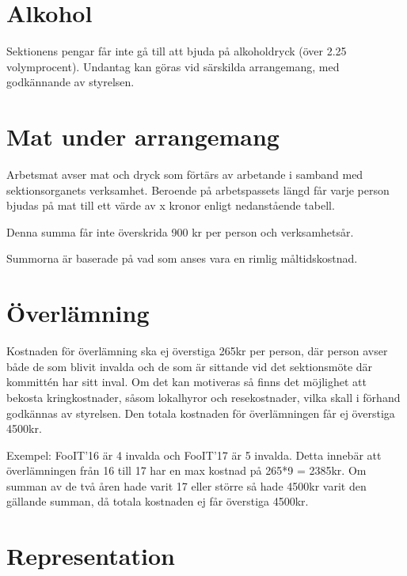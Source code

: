 \documentclass[11pt, includeaddress]{classes/cthit}
\begin{document}
\section{Alkohol}
Sektionens pengar får inte gå till att bjuda på alkoholdryck (över 2.25 volymprocent). Undantag kan göras vid särskilda arrangemang, med godkännande av styrelsen.

\section{Mat under arrangemang}
Arbetsmat avser mat och dryck som förtärs av arbetande i samband med sektionsorganets verksamhet. 
Beroende på arbetspassets längd får varje person bjudas på mat till ett värde av x kronor enligt nedanstående tabell.

\addvbuffer[\the\baselineskip]{\begin{tabular}{ l  c  c  c}
	\centering
	Timmar & [0-3] & (3-6] & (6-$\infty$) \\
	\hline
	Kronor & 0 & 75 & 150 \\
\end{tabular}}

    Denna summa får inte överskrida 900 kr per person och verksamhetsår.

    Summorna är baserade på vad som anses vara en rimlig
    måltidskostnad.


\section{Överlämning}
Kostnaden för överlämning ska ej överstiga 265kr per person, där person avser både de som blivit invalda och de som är sittande vid det sektionsmöte där kommittén har sitt inval. Om det kan motiveras så finns det möjlighet att bekosta kringkostnader, såsom lokalhyror och resekostnader, vilka skall i förhand godkännas av styrelsen. Den totala kostnaden för överlämningen får ej överstiga 4500kr.

Exempel: FooIT’16 är 4 invalda och FooIT’17 är 5 invalda. Detta innebär att överlämningen från 16 till 17 har en max kostnad på 265*9 = 2385kr. Om summan av de två åren hade varit 17 eller större så hade 4500kr varit den gällande summan, då totala kostnaden ej får överstiga 4500kr.

\section{Representation}
\end{document}
